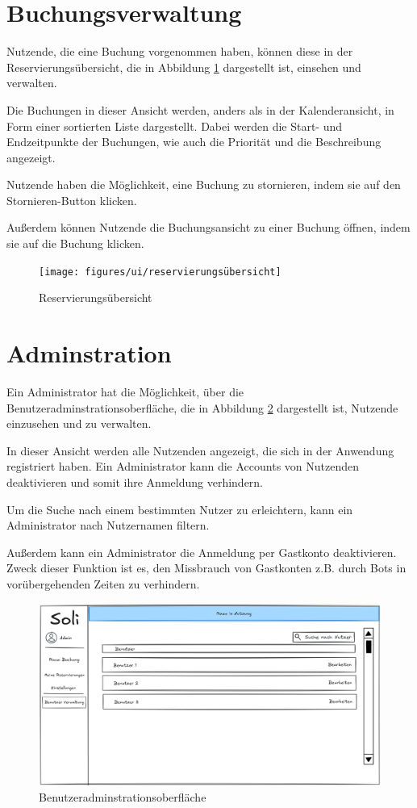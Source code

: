 \section{Buchungsverwaltung}
Nutzende, die eine Buchung vorgenommen haben, können diese in der Reservierungsübersicht,
die in Abbildung \ref{fig:overview} dargestellt ist, einsehen und verwalten.

Die Buchungen in dieser Ansicht werden, anders als in der Kalenderansicht, in Form einer sortierten Liste dargestellt.
Dabei werden die Start- und Endzeitpunkte der Buchungen, wie auch die Priorität und die Beschreibung angezeigt.

Nutzende haben die Möglichkeit, eine Buchung zu stornieren, indem sie auf den Stornieren-Button klicken.

Außerdem können Nutzende die Buchungsansicht zu einer Buchung öffnen, indem sie auf die Buchung klicken.


\begin{figure}[ht]
    \texttt{[image: figures/ui/reservierungsübersicht]}
    \caption{Reservierungsübersicht}
    \label{fig:overview}
\end{figure}
\clearpage

\section{Adminstration}
Ein Administrator hat die Möglichkeit, über die Benutzeradminstrationsoberfläche,
die in Abbildung \ref{fig:adminuser} dargestellt ist, Nutzende einzusehen und zu verwalten.

In dieser Ansicht werden alle Nutzenden angezeigt, die sich in der Anwendung registriert haben.
Ein Administrator kann die Accounts von Nutzenden deaktivieren und somit ihre Anmeldung verhindern.

Um die Suche nach einem bestimmten Nutzer zu erleichtern, kann ein Administrator nach Nutzernamen filtern.

Außerdem kann ein Administrator die Anmeldung per Gastkonto deaktivieren.
Zweck dieser Funktion ist es, den Missbrauch von Gastkonten z.B. durch Bots in vorübergehenden Zeiten zu verhindern.

\begin{figure}[ht]
    \centering
    \includegraphics[scale=0.15]{figures/ui/useradminui}
    \caption{Benutzeradminstrationsoberfläche}
    \label{fig:adminuser}
\end{figure}


